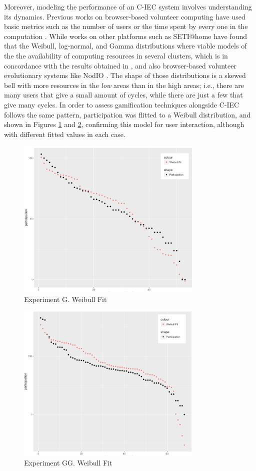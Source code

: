 Moreover, modeling the performance of an C-IEC system
involves understanding its dynamics. Previous works on browser-based
volunteer computing have used basic metrics such as
the number of users or the time spent by every one in the
computation \cite{DBLP:journals/gpem/LaredoBGVAGF14, 2016arXiv160101607M}. 
While works on other platforms such as SETI@home
\cite{javadi2009mining} have found that the Weibull, log-normal, and
Gamma distributions where viable models of the  
the availability of computing resources in several clusters, which  is 
in concordance with the results obtained in \cite{agajaj}, and also
browser-based volunteer evolutionary systems like NodIO \cite{DBLP:conf/gecco/MereloCGCRV16}.
The shape of those distributions is a skewed bell
with more resources in the {\em low} areas than in the high areas; i.e., 
there are many users that give a small amount of cycles, while there
are just a few that give many cycles. In order to assess gamification techniques alongside C-IEC follows the
same pattern, participation was flitted to a 
Weibull distribution,
and shown in Figures \ref{fig:w2} and \ref{fig:w3}, 
confirming  this model for user interaction, although with different fitted
values in each case. 
%
\begin{figure}[!t]
    \centering
        \includegraphics[width=3.5in]{img/weibull_2.png}
    \caption{Experiment G. Weibull Fit}
    \label{fig:w2}
\end{figure}
%
\begin{figure}[!t]
    \centering
        \includegraphics[width=3.5in]{img/weibull_3.png}
    \caption{Experiment GG. Weibull Fit}
    \label{fig:w3}
\end{figure}


